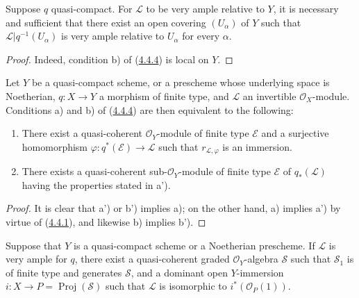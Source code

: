 \begin{corollary}[4.4.5]
\label{II.4.4.5}
Suppose $q$ quasi-compact. For $\mathcal{L}$ to be very ample
relative to $Y$, it is necessary and sufficient that there exist an open
covering $(U_\alpha)$ of $Y$ such that
$\mathcal{L}|q^{-1}(U_\alpha)$ is very ample relative to $U_\alpha$ for
every $\alpha$.
\end{corollary}

\begin{proof}
Indeed, condition b) of (\hyperref[II.4.4.4]{4.4.4}) is local on
$Y$.
\end{proof}

\begin{proposition}[4.4.6]
\label{II.4.4.6}
Let $Y$ be a quasi-compact scheme, or a prescheme whose underlying space
is Noetherian, $q:X\to Y$ a morphism of finite type, and $\mathcal{L}$ an
invertible $\mathcal{O}_X$-module. Conditions a) and b) of
(\hyperref[II.4.4.4]{4.4.4}) are then equivalent to the following:
\begin{enumerate}
  \item[\rm{a')}] There exist a quasi-coherent $\mathcal{O}_Y$-module of finite
  type $\mathcal{E}$ and a surjective homomorphism
  $\varphi:q^*(\mathcal{E})\to\mathcal{L}$ such that
  $r_{\mathcal{L},\varphi}$ is an immersion.
  \item[\rm{b')}] There exists a quasi-coherent sub-$\mathcal{O}_Y$-module of
  finite type $\mathcal{E}$ of $q_*(\mathcal{L})$ having the properties stated
  in a').
\end{enumerate}
\end{proposition}

\begin{proof}
It is clear that a') or b') implies a); on the other hand, a) implies a') by
virtue of (\hyperref[II.4.4.1]{4.4.1}), and likewise b) implies b').
\end{proof}

\begin{corollary}[4.4.7]
\label{II.4.4.7}
Suppose that $Y$ is a quasi-compact scheme or a Noetherian prescheme. If
$\mathcal{L}$ is very ample for $q$, there exist a quasi-coherent graded
$\mathcal{O}_Y$-algebra $\mathcal{S}$ such that $\mathcal{S}_1$ is of finite
type and generates $\mathcal{S}$, and a dominant open $Y$-immersion
$i:X\to P=\operatorname{Proj}(\mathcal{S})$ such that $\mathcal{L}$ is
isomorphic to $i^*(\mathcal{O}_P(1))$.
\end{corollary}

